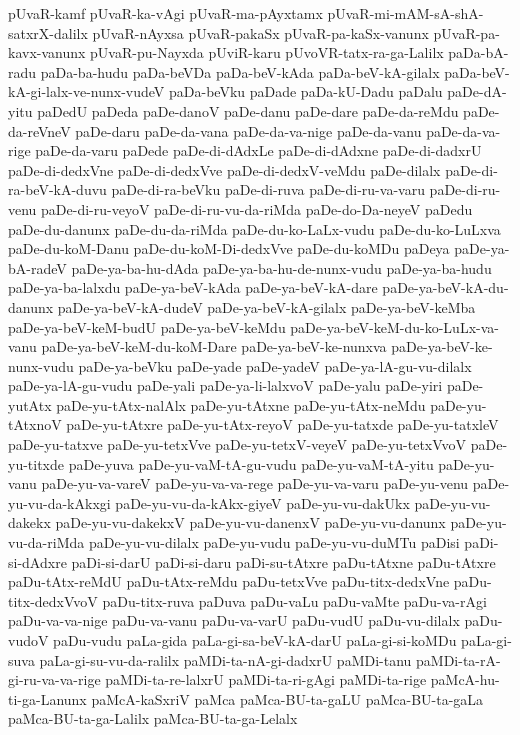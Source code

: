 {pUvaR-kamf
pUvaR-ka-vAgi
pUvaR-ma-pAyxtamx
pUvaR-mi-mAM-sA-shA-satxrX-dalilx
pUvaR-nAyxsa
pUvaR-pakaSx
pUvaR-pa-kaSx-vanunx
pUvaR-pa-kavx-vanunx
pUvaR-pu-Nayxda
pUviR-karu
pUvoVR-tatx-ra-ga-Lalilx
paDa-bA-radu
paDa-ba-hudu
paDa-beVDa
paDa-beV-kAda
paDa-beV-kA-gilalx
paDa-beV-kA-gi-lalx-ve-nunx-vudeV
paDa-beVku
paDade
paDa-kU-Dadu
paDalu
paDe-dA-yitu
paDedU
paDeda
paDe-danoV
paDe-danu
paDe-dare
paDe-da-reMdu
paDe-da-reVneV
paDe-daru
paDe-da-vana
paDe-da-va-nige
paDe-da-vanu
paDe-da-va-rige
paDe-da-varu
paDede
paDe-di-dAdxLe
paDe-di-dAdxne
paDe-di-dadxrU
paDe-di-dedxVne
paDe-di-dedxVve
paDe-di-dedxV-veMdu
paDe-dilalx
paDe-di-ra-beV-kA-duvu
paDe-di-ra-beVku
paDe-di-ruva
paDe-di-ru-va-varu
paDe-di-ru-venu
paDe-di-ru-veyoV
paDe-di-ru-vu-da-riMda
paDe-do-Da-neyeV
paDedu
paDe-du-danunx
paDe-du-da-riMda
paDe-du-ko-LaLx-vudu
paDe-du-ko-LuLxva
paDe-du-koM-Danu
paDe-du-koM-Di-dedxVve
paDe-du-koMDu
paDeya
paDe-ya-bA-radeV
paDe-ya-ba-hu-dAda
paDe-ya-ba-hu-de-nunx-vudu
paDe-ya-ba-hudu
paDe-ya-ba-lalxdu
paDe-ya-beV-kAda
paDe-ya-beV-kA-dare
paDe-ya-beV-kA-du-danunx
paDe-ya-beV-kA-dudeV
paDe-ya-beV-kA-gilalx
paDe-ya-beV-keMba
paDe-ya-beV-keM-budU
paDe-ya-beV-keMdu
paDe-ya-beV-keM-du-ko-LuLx-va-vanu
paDe-ya-beV-keM-du-koM-Dare
paDe-ya-beV-ke-nunxva
paDe-ya-beV-ke-nunx-vudu
paDe-ya-beVku
paDe-yade
paDe-yadeV
paDe-ya-lA-gu-vu-dilalx
paDe-ya-lA-gu-vudu
paDe-yali
paDe-ya-li-lalxvoV
paDe-yalu
paDe-yiri
paDe-yutAtx
paDe-yu-tAtx-nalAlx
paDe-yu-tAtxne
paDe-yu-tAtx-neMdu
paDe-yu-tAtxnoV
paDe-yu-tAtxre
paDe-yu-tAtx-reyoV
paDe-yu-tatxde
paDe-yu-tatxleV
paDe-yu-tatxve
paDe-yu-tetxVve
paDe-yu-tetxV-veyeV
paDe-yu-tetxVvoV
paDe-yu-titxde
paDe-yuva
paDe-yu-vaM-tA-gu-vudu
paDe-yu-vaM-tA-yitu
paDe-yu-vanu
paDe-yu-va-vareV
paDe-yu-va-va-rege
paDe-yu-va-varu
paDe-yu-venu
paDe-yu-vu-da-kAkxgi
paDe-yu-vu-da-kAkx-giyeV
paDe-yu-vu-dakUkx
paDe-yu-vu-dakekx
paDe-yu-vu-dakekxV
paDe-yu-vu-danenxV
paDe-yu-vu-danunx
paDe-yu-vu-da-riMda
paDe-yu-vu-dilalx
paDe-yu-vudu
paDe-yu-vu-duMTu
paDisi
paDi-si-dAdxre
paDi-si-darU
paDi-si-daru
paDi-su-tAtxre
paDu-tAtxne
paDu-tAtxre
paDu-tAtx-reMdU
paDu-tAtx-reMdu
paDu-tetxVve
paDu-titx-dedxVne
paDu-titx-dedxVvoV
paDu-titx-ruva
paDuva
paDu-vaLu
paDu-vaMte
paDu-va-rAgi
paDu-va-va-nige
paDu-va-vanu
paDu-va-varU
paDu-vudU
paDu-vu-dilalx
paDu-vudoV
paDu-vudu
paLa-gida
paLa-gi-sa-beV-kA-darU
paLa-gi-si-koMDu
paLa-gi-suva
paLa-gi-su-vu-da-ralilx
paMDi-ta-nA-gi-dadxrU
paMDi-tanu
paMDi-ta-rA-gi-ru-va-va-rige
paMDi-ta-re-lalxrU
paMDi-ta-ri-gAgi
paMDi-ta-rige
paMcA-hu-ti-ga-Lanunx
paMcA-kaSxriV
paMca
paMca-BU-ta-gaLU
paMca-BU-ta-gaLa
paMca-BU-ta-ga-Lalilx
paMca-BU-ta-ga-Lelalx
}
